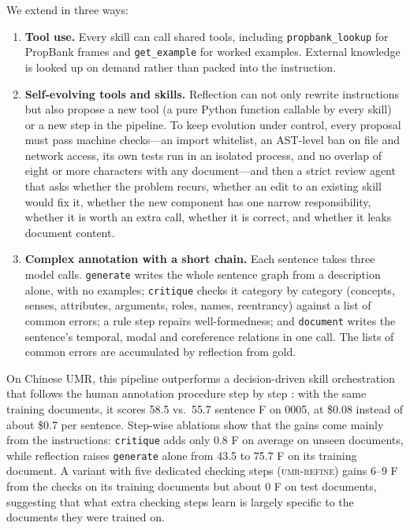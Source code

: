 \documentclass[11pt]{article}
\newcommand{\umr}{\textsc{UMR}\xspace}
\newcommand{\tree}{\textsc{umr-tree}\xspace}
\newcommand{\refine}{\textsc{umr-refine}\xspace}
\newcommand{\skill}[1]{\texttt{#1}}
\begin{document}
We extend \citet{acl2026base} in three ways:
\begin{enumerate}[leftmargin=*,itemsep=1pt,topsep=2pt]
  \item \textbf{Tool use.} Every skill can call shared tools, including \texttt{propbank\_lookup} for PropBank frames and \texttt{get\_example} for worked examples. External knowledge is looked up on demand rather than packed into the instruction.
  \item \textbf{Self-evolving tools and skills.} Reflection can not only rewrite instructions but also propose a new tool (a pure Python function callable by every skill) or a new step in the pipeline. To keep evolution under control, every proposal must pass machine checks---an import whitelist, an AST-level ban on file and network access, its own tests run in an isolated process, and no overlap of eight or more characters with any document---and then a strict review agent that asks whether the problem recurs, whether an edit to an existing skill would fix it, whether the new component has one narrow responsibility, whether it is worth an extra call, whether it is correct, and whether it leaks document content.
  \item \textbf{Complex annotation with a short chain.} Each sentence takes three model calls. \skill{generate} writes the whole sentence graph from a description alone, with no examples; \skill{critique} checks it category by category (concepts, senses, attributes, arguments, roles, names, reentrancy) against a list of common errors; a rule step repairs well-formedness; and \skill{document} writes the sentence's temporal, modal and coreference relations in one call. The lists of common errors are accumulated by reflection from gold.
\end{enumerate}

On Chinese \umr, this pipeline outperforms a decision-driven skill orchestration that follows the human annotation procedure step by step \citep[\tree;][]{anon2026orchestration}: with the same training documents, it scores 58.5 vs.\ 55.7 sentence F on 0005, at \$0.08 instead of about \$0.7 per sentence. Step-wise ablations show that the gains come mainly from the instructions: \skill{critique} adds only 0.8 F on average on unseen documents, while reflection raises \skill{generate} alone from 43.5 to 75.7 F on its training document. A variant with five dedicated checking steps (\refine) gains 6--9 F from the checks on its training documents but about 0 F on test documents, suggesting that what extra checking steps learn is largely specific to the documents they were trained on.
\end{document}
